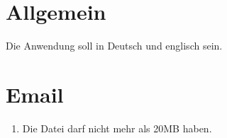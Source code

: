 \documentclass{article}
\author{Arwed Mett}
\begin{document}
\section{Allgemein}
Die Anwendung soll in Deutsch und englisch sein.

\section{Email}
\begin{enumerate}
\item Die Datei darf nicht mehr als 20MB haben.
\end{enumerate}
\end{document}
